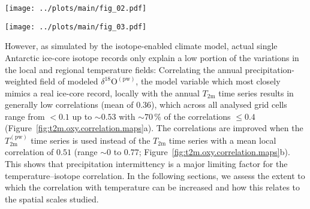 \documentclass[draft]{agujournal2019}
\begin{document}
\begin{figure*}[t]%
\centering
\texttt{[image: ../plots/main/fig\_02.pdf]}
\caption{%
  Temperature decorrelation lengths across Antarctica. The temperature
  decorrelation lengths ($\tau$, in km) for each Antarctic model grid cell were
  estimated by fitting an exponential model to the correlation--distance
  relationship (cf.\ equation~\ref{eq:t2m.decorr}) obtained from correlating the
  local annual near-surface $T_{2\mathrm{m}}$ time series with the respective
  temperature time series from all other grid cells. Note that only the
  continental grid cells were used for the fit. Although the decorrelation
  lengths show a strong partition between East and West Antarctica, they
  are larger than $1000$\,km at most locations.}
\label{fig:t2m.decorrelation.map}%
\end{figure*}%

\begin{figure*}[t]%
\centering
\texttt{[image: ../plots/main/fig\_03.pdf]}
\caption{%
  The local temperature--isotope relationship across Antarctica. Shown are the
  local correlations for each model grid cell between the annual time series of
  precipitation-weighted oxygen isotope composition and of (a) near-surface
  temperature and (b) precipitation-weighted near-surface temperature. The
  difference between the maps clearly demonstrates that precipitation
  intermittency is a major limiting factor for the temperature--isotope
  relationship.}
\label{fig:t2m.oxy.correlation.maps}%
\end{figure*}%

However, as simulated by the isotope-enabled climate model, actual single
Antarctic ice-core isotope records only explain a low portion of the variations
in the local and regional temperature fields: Correlating the annual
precipitation-weighted field of modeled
$\delta^{18}\mathrm{O}^{\mathrm{(pw)}}$, the model variable which most closely
mimics a real ice-core record, locally with the annual $T_{2\mathrm{m}}$ time
series results in generally low correlations (mean of $0.36$), which across all
analysed grid cells range from $<0.1$ up to $\sim0.53$ with $\sim70\,\%$ of the
correlations $\leq0.4$ (Figure~\ref{fig:t2m.oxy.correlation.maps}a). The
correlations are improved when the $T_{2\mathrm{m}}^{\mathrm{(pw)}}$ time series
is used instead of the $T_{2\mathrm{m}}$ time series with a mean local
correlation of $0.51$ (range $\sim0$ to $0.77$;
Figure~\ref{fig:t2m.oxy.correlation.maps}b). This shows that precipitation
intermittency is a major limiting factor for the temperature--isotope
correlation. In the following sections, we assess the extent to which the
correlation with temperature can be increased and how this relates to the
spatial scales studied.
\end{document}
